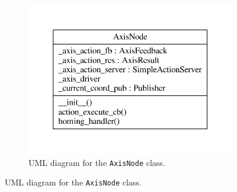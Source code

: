 \documentclass{article}
\begin{document}
\begin{figure}[H]
    \centering
    \begin{subfigure}{\textwidth}
        \centering
        \includegraphics{images/UML/axis_driver/axis_node.pdf}
        \caption{UML diagram for the \texttt{AxisNode} class.}
        \label{fig:axis_uml_node}
    \end{subfigure}%
\end{figure}
\end{document}
